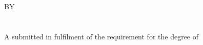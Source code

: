 \documentclass[a4paper]{memoir}
\begin{document}
\thispagestyle{empty}

\fontsize{17bp}{19bp}\selectfont
\begin{center}
\MakeUppercase{\myTitle}\\
\ifdefined\mySubtitle
\MakeUppercase{\mySubtitle}\\~\\
\else
\\~\\
\fi
\vfill
BY\\~\\
\vfill
\MakeTextUppercase{\myName}\\
\vfill
A \myDocument submitted in fulfilment of the requirement for the degree of 
\myDegree
\vfill
\myKulliyyah\\
\myUni\\
\vfill
\MakeTextUppercase{\myTime}
\end{center}
\end{document}
